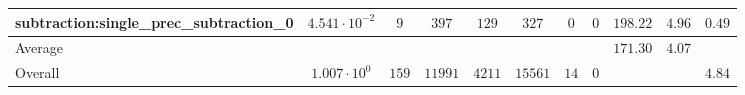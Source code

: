 \begin{tabular}{|l|c|c|c|c|c|c|c|c|c|c|}
subtraction:single\_prec\_subtraction\_0         & $ 4.541 \cdot 10^{-2} $ & $ 9      $ & $ 397   $ & $ 129  $ & $ 327   $ & $ 0  $ & $ 0 $ & $ 198.22      $ & $ 4.96    $ & $ 0.49    $ \\
\hline
Average                                          & $                     $ & $        $ & $       $ & $      $ & $       $ & $    $ & $   $ & $ 171.30      $ & $ 4.07    $ & $         $ \\
\hline
Overall                                          & $ 1.007 \cdot 10^{0}  $ & $ 159    $ & $ 11991 $ & $ 4211 $ & $ 15561 $ & $ 14 $ & $ 0 $ & $             $ & $         $ & $ 4.84    $ \\
\hline
\end{tabular}
